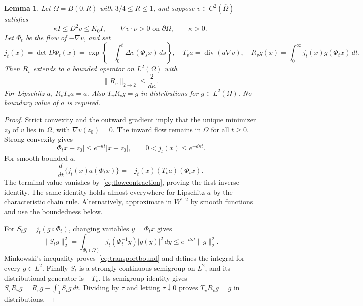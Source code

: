 \documentclass[11pt]{article}
\newtheorem{lemma}[theorem]{Lemma}
\theoremstyle{remark}
\newcommand{\diver}{\operatorname{div}}
\newcommand{\norm}[1]{\lVert #1\rVert}
\newcommand{\abs}[1]{\lvert #1\rvert}
\begin{document}
\begin{lemma}\label{lem:transport}
Let $\Omega=B(0,R)$ with $3/4\le R\le1$, and suppose $v\in C^2(\overline\Omega)$ satisfies
\begin{equation}\label{eq:flowgeometry}
 \kappa I\le D^2v\le K_0I,\qquad \nabla v\cdot\nu>0\text{ on }\partial\Omega,
 \qquad \kappa>0.
\end{equation}
Let $\Phi_t$ be the flow of $-\nabla v$, and set
\[
 j_t(x)=\det D\Phi_t(x)
 =\exp\left\{-\int_0^t\Delta v(\Phi_sx)\,ds\right\},
 \quad T_va=\diver(a\nabla v),
 \quad R_vg(x)=\int_0^\infty j_t(x)g(\Phi_tx)\,dt.
\]
Then $R_v$ extends to a bounded operator on $L^2(\Omega)$ with
\begin{equation}\label{eq:transportbound}
 \norm{R_v}_{2\to2}\le\frac{2}{d\kappa}.
\end{equation}
For Lipschitz $a$, $R_vT_va=a$. Also $T_vR_vg=g$ in distributions for $g\in L^2(\Omega)$. No boundary value of $a$ is required.
\end{lemma}
\begin{proof}
Strict convexity and the outward gradient imply that the unique minimizer $z_0$ of $v$ lies in $\Omega$, with $\nabla v(z_0)=0$. The inward flow remains in $\Omega$ for all $t\ge0$. Strong convexity gives
\begin{equation}\label{eq:flowcontraction}
 \abs{\Phi_tx-z_0}\le e^{-\kappa t}\abs{x-z_0},
 \qquad 0<j_t(x)\le e^{-d\kappa t}.
\end{equation}
For smooth bounded $a$,
\[
 \frac{d}{dt}\{j_t(x)a(\Phi_tx)\}=-j_t(x)(T_va)(\Phi_tx).
\]
The terminal value vanishes by~\eqref{eq:flowcontraction}, proving the first inverse identity. The same identity holds almost everywhere for Lipschitz $a$ by the characteristic chain rule. Alternatively, approximate in $W^{1,2}$ by smooth functions and use the boundedness below.

For $S_tg=j_t(g\circ\Phi_t)$, changing variables $y=\Phi_tx$ gives
\[
 \norm{S_tg}_2^2
 =\int_{\Phi_t(\Omega)}j_t(\Phi_t^{-1}y)\abs{g(y)}^2\,dy
 \le e^{-d\kappa t}\norm g_2^2.
\]
Minkowski's inequality proves~\eqref{eq:transportbound} and defines the integral for every $g\in L^2$. Finally $S_t$ is a strongly continuous semigroup on $L^2$, and its distributional generator is $-T_v$. Its semigroup identity gives
$S_\tau R_vg=R_vg-\int_0^\tau S_tg\,dt$.
Dividing by $\tau$ and letting $\tau\downarrow0$ proves $T_vR_vg=g$ in distributions.
\end{proof}
\end{document}
